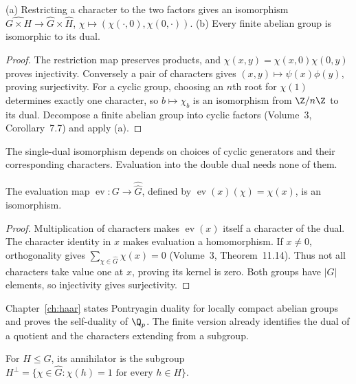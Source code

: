 \begin{proposition}\label{prop:dualprod}
(a) Restricting a character to the two factors gives an isomorphism
$\widehat{G\times H}\to\widehat G\times\widehat H$,
$\chi\mapsto(\chi(\cdot,0),\chi(0,\cdot))$.
(b) Every finite abelian group is isomorphic to its dual.
\end{proposition}
\begin{proof}
The restriction map preserves products, and $\chi(x,y)=\chi(x,0)\chi(0,y)$ proves injectivity. Conversely a pair of characters gives $(x,y)\mapsto\psi(x)\phi(y)$, proving surjectivity. For a cyclic group, choosing an $n$th root for $\chi(1)$ determines exactly one character, so $b\mapsto\chi_b$ is an isomorphism from $\Z/n\Z$ to its dual. Decompose a finite abelian group into cyclic factors (Volume~3, Corollary~7.7) and apply (a).
\end{proof}

The single-dual isomorphism depends on choices of cyclic generators and their corresponding characters. Evaluation into the double dual needs none of them.

\begin{theorem}[duality]\label{thm:finiteduality}
The evaluation map $\operatorname{ev}:G\to\widehat{\widehat G}$, defined by $\operatorname{ev}(x)(\chi)=\chi(x)$, is an isomorphism.
\end{theorem}
\begin{proof}
Multiplication of characters makes $\operatorname{ev}(x)$ itself a character of the dual. The character identity in $x$ makes evaluation a homomorphism. If $x\ne0$, orthogonality gives $\sum_{\chi\in\widehat G}\chi(x)=0$ (Volume~3, Theorem~11.14). Thus not all characters take value one at $x$, proving its kernel is zero. Both groups have $|G|$ elements, so injectivity gives surjectivity.
\end{proof}

Chapter~\ref{ch:haar} states Pontryagin duality for locally compact abelian groups and proves the self-duality of $\Q_p$. The finite version already identifies the dual of a quotient and the characters extending from a subgroup.

\begin{definition}
For $H\le G$, its annihilator is the subgroup
$H^\perp=\{\chi\in\widehat G:\chi(h)=1\text{ for every }h\in H\}$.
\end{definition}

